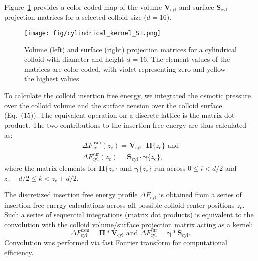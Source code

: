\documentclass[10pt, a4paper, twocolumn]{article}
\begin{document}
Figure~\ref{fig:cylindrical_kernel_SI} provides a color-coded map of the volume $\bm{V}_{\text{cyl}}$ and surface $\bm{S}_{\text{cyl}}$ projection matrices for a selected colloid size ($d = 16$).

\begin{figure}[h]
    \centering
    \texttt{[image: fig/cylindrical\_kernel\_SI.png]}
    \caption{
    Volume (left) and surface (right) projection matrices for a cylindrical colloid with diameter and height $d = 16$. The element values of the matrices are color-coded, with violet representing zero and yellow the highest values.
    }
    \label{fig:cylindrical_kernel_SI}
\end{figure}

To calculate the colloid insertion free energy, we integrated the osmotic pressure over the colloid volume and the surface tension over the colloid surface (Eq.~(15)).
The equivalent operation on a discrete lattice is the matrix dot product.
The two contributions to the insertion free energy are thus calculated as:
\begin{equation}
    \label{eq:cyl_fe_osm}
    \begin{split}
        \Delta F_{\text{cyl}}^{\text{osm}}(z_{\text{c}}) = \bm{V}_{\text{cyl}} \cdot \boldsymbol{\Pi}\{z_{\text{c}}\} \text{ and} \\
        \Delta F_{\text{cyl}}^{\text{sur}}(z_{\text{c}}) = \bm{S}_{\text{cyl}} \cdot \boldsymbol{\gamma}\{z_{\text{c}}\},
    \end{split}
\end{equation}
where the matrix elements for $\boldsymbol{\Pi}\{z_{\text{c}}\}$ and $\boldsymbol{\gamma}\{z_{\text{c}}\}$ run across $0 \leq i < d/2$ and $z_{\text{c}} - d/2 \leq k < z_{\text{c}} + d/2$.

The discretized insertion free energy profile $\Delta F_{\text{cyl}}$ is obtained from a series of insertion free energy calculations across all possible colloid center positions $z_{\text{c}}$.
Such a series of sequential integrations (matrix dot products) is equivalent to the convolution with the colloid volume/surface projection matrix acting as a kernel:
\begin{equation*}
    \Delta F_{\text{cyl}}^{\text{osm}} = \boldsymbol{\Pi} \ast \bm{V}_{\text{cyl}} \text{ and }
    \Delta F_{\text{cyl}}^{\text{sur}} = \boldsymbol{\gamma} \ast \bm{S}_{\text{cyl}}.
\end{equation*}
Convolution was performed via fast Fourier transform for computational efficiency.
\end{document}
